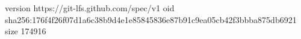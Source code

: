 version https://git-lfs.github.com/spec/v1
oid sha256:176f4f26f07d1a6c38b9d4e1e85845836e87b91c9ea05cb42f3bbba875db6921
size 174916
